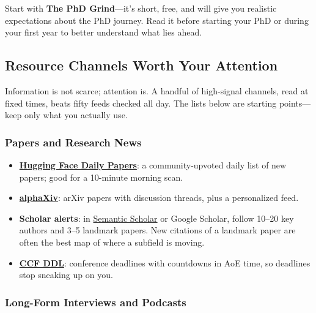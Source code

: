 \documentclass[11pt,a4paper]{article}
\begin{document}
\begin{tcolorbox}[colback=yellow!10,colframe=red!50,title=Reading Recommendation]
Start with \textbf{The PhD Grind}—it's short, free, and will give you realistic expectations about the PhD journey. Read it before starting your PhD or during your first year to better understand what lies ahead.
\end{tcolorbox}

\subsection{Resource Channels Worth Your Attention}\label{sec:resources}

\begin{tcolorbox}[colback=blue!5,colframe=darkblue,title={Attention Is the Scarce Resource}]
Information is not scarce; attention is. A handful of high-signal channels, read at fixed times, beats fifty feeds checked all day. The lists below are starting points---keep only what you actually use.
\end{tcolorbox}

\subsubsection{Papers and Research News}

\begin{itemize}
    \item \textbf{\href{https://huggingface.co/papers}{Hugging Face Daily Papers}}: a community-upvoted daily list of new papers; good for a 10-minute morning scan.
    \item \textbf{\href{https://www.alphaxiv.org/}{alphaXiv}}: arXiv papers with discussion threads, plus a personalized feed.
    \item \textbf{Scholar alerts}: in \href{https://www.semanticscholar.org/}{Semantic Scholar} or Google Scholar, follow 10--20 key authors and 3--5 landmark papers. New citations of a landmark paper are often the best map of where a subfield is moving.
    \item \textbf{\href{https://ccfddl.com/}{CCF DDL}}: conference deadlines with countdowns in AoE time, so deadlines stop sneaking up on you.
\end{itemize}

\subsubsection{Long-Form Interviews and Podcasts}
\end{document}
